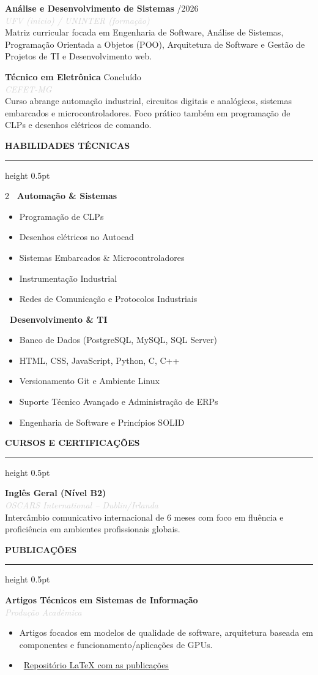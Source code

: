 \documentclass[10pt,a4paper]{article}
\newcommand{\cvsection}[1]{
    \vspace{12pt}
    {\large\textcolor{sectcol}{\textbf{\MakeUppercase{#1}}}}
    \vspace{2pt}
    \hrule height 0.5pt \relax
    \vspace{6pt}
}
\newcommand{\cvevent}[4]{
    \noindent \textbf{#2} \hfill \textcolor{sectcol}{\small \faCalendar* #1} \\
    \noindent \textit{\textcolor{lightgray}{#3}} \vspace{4pt} \\
    {#4} \vspace{8pt}
}
\begin{document}
\cvevent{06/2026}{Análise e Desenvolvimento de Sistemas}{UFV (inicio) / UNINTER (formação)}{
Matriz curricular focada em Engenharia de Software, Análise de Sistemas, Programação Orientada a Objetos (POO), Arquitetura de Software e Gestão de Projetos de TI e Desenvolvimento web.
}

\cvevent{Concluído}{Técnico em Eletrônica}{CEFET-MG}{
Curso abrange automação industrial, circuitos digitais e analógicos, sistemas embarcados e microcontroladores. Foco prático também em programação de CLPs e desenhos elétricos de comando.
}

\cvsection{Habilidades Técnicas}

\begin{multicols}{2}
    \textbf{\faIndustry \ Automação \& Sistemas}
    \begin{itemize}
        \item Programação de CLPs
        \item Desenhos elétricos no Autocad
        \item Sistemas Embarcados & Microcontroladores
        \item Instrumentação Industrial
        \item Redes de Comunicação e Protocolos Industriais
    \end{itemize}

    \columnbreak

    \textbf{\faLaptopCode \ Desenvolvimento \& TI}
    \begin{itemize}
        \item Banco de Dados (PostgreSQL, MySQL, SQL Server)
        \item HTML, CSS, JavaScript, Python, C, C++
        \item Versionamento Git e Ambiente Linux
        \item Suporte Técnico Avançado e Administração de ERPs
        \item Engenharia de Software e Princípios SOLID
    \end{itemize}
\end{multicols}

\cvsection{Cursos e Certificações}
\cvevent{2019}{Inglês Geral (Nível B2)}{OSCARS International -- Dublin/Irlanda}{
Intercâmbio comunicativo internacional de 6 meses com foco em fluência e proficiência em ambientes profissionais globais.
}

\cvsection{Publicações}
\cvevent{2021}{Artigos Técnicos em Sistemas de Informação}{Produção Acadêmica}{
\begin{itemize}
    \item Artigos focados em modelos de qualidade de software, arquitetura baseada em componentes e funcionamento/aplicações de GPUs.
    \item \faGithub \ \href{https://github.com/GabMatheus/Pesquisas_Latex}{Repositório LaTeX com as publicações}
\end{itemize}
}
\end{document}
